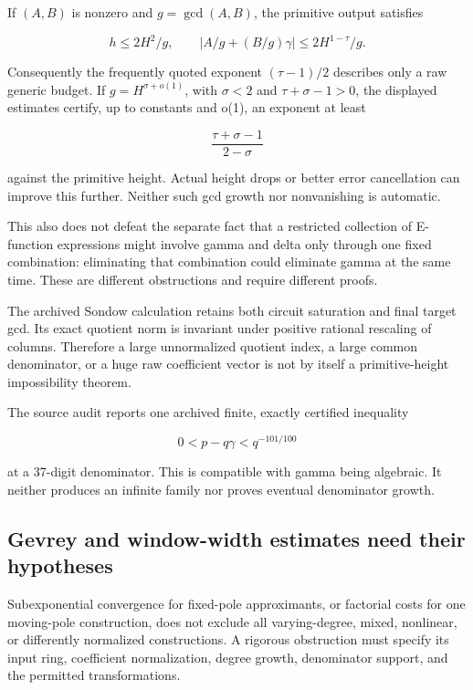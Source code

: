 \documentclass[11pt,a4paper]{article}
\theoremstyle{definition}
\theoremstyle{remark}
\theoremstyle{plain}
\numberwithin{equation}{section}
\begin{document}
If $(A,B)$ is nonzero and $g=\gcd(A,B)$, the primitive output satisfies

\[
h\le2H^2/g,\qquad
|A/g+(B/g)\gamma|\le2H^{1-\tau}/g.
\]

Consequently the frequently quoted exponent \((\tau-1)/2\) describes
only a raw generic budget. If \(g=H^{\sigma+o(1)}\), with \(\sigma<2\)
and \(\tau+\sigma-1>0\), the displayed estimates certify, up to
constants and o(1), an exponent at least

\[
\frac{\tau+\sigma-1}{2-\sigma}
\]

against the primitive height. Actual height drops or better error
cancellation can improve this further. Neither such gcd growth nor
nonvanishing is automatic.

This also does not defeat the separate fact that a restricted collection
of E-function expressions might involve gamma and delta only through one
fixed combination: eliminating that combination could eliminate gamma at
the same time. These are different obstructions and require different
proofs.

The archived Sondow calculation retains both circuit saturation and
final target gcd. Its exact quotient norm is invariant under positive
rational rescaling of columns. Therefore a large unnormalized quotient
index, a large common denominator, or a huge raw coefficient vector is
not by itself a primitive-height impossibility theorem.

The source audit reports one archived finite, exactly certified
inequality

\[
0<p-q\gamma<q^{-101/100}
\]

at a 37-digit denominator. This is compatible with gamma being
algebraic. It neither produces an infinite family nor proves eventual
denominator growth.

\subsection{Gevrey and window-width estimates need their
hypotheses}\label{sc:au:gevrey-and-window-width-estimates-need-their-hypotheses}

Subexponential convergence for fixed-pole approximants, or factorial
costs for one moving-pole construction, does not exclude all
varying-degree, mixed, nonlinear, or differently normalized
constructions. A rigorous obstruction must specify its input ring,
coefficient normalization, degree growth, denominator support, and the
permitted transformations.
\end{document}
